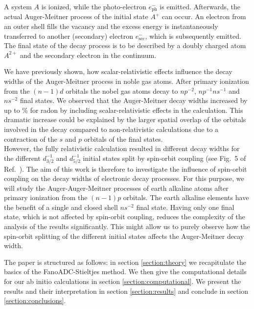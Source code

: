 A system $A$ is ionized, while the photo-electron $e^-_\text{ph}$ is emitted.      
Afterwards, the actual Auger-Meitner
process of the initial state $A^+$ can occur.    
An electron from an outer                                       
shell fills the vacancy and the excess energy is instantaneously transferred  
to another (secondary) electron $e^-_\text{sec}$, which
is subsequently emitted. The final state of the decay process   
is to be described by a doubly charged atom $A^{2+}$ and the secondary        
electron in the continuum.

We have previously shown, how
scalar-relativistic effects influence the decay widths of the Auger-Meitner
process in
noble gas atoms. \cite{Fasshauer15_1}
After primary ionization from the $(n-1)d$ orbitals the nobel
gas atoms decay to $np^{-2}$, $np^{-1}ns^{-1}$ and $ns^{-2}$ final states.
We observed that the Auger-Meitner decay widths increased by up to \unit[326]{\%}
for radon
by including scalar-relativistic effects in the calculation. This
dramatic increase could be explained by the larger spatial
overlap of the orbitals
involved in the decay compared to non-relativistic calculations due to
a contraction of the $s$ and $p$ orbitals of the final states.\\
However, the fully relativistic calculation resulted in different decay widths
for the different $d_{3/2}^{-1}$ and $d_{5/2}^{-1}$ initial states split by
spin-orbit coupling (see Fig.~5 of Ref.~\cite{Fasshauer15_1}).
The aim of this work is therefore to investigate the
influence of spin-orbit coupling on the decay widths of electronic decay processes.
For this purpose, we will study the Auger-Auger-Meitner processes of earth alkaline atoms
after primary ionization from the $(n-1)p$ orbitals. The earth alkaline elements
have the benefit of a single and closed shell $ns^{-2}$ final state.
Having only one final state, which is not affected by spin-orbit coupling,
reduces the complexity of the analysis of the results significantly.
This might allow us to purely observe how the spin-orbit splitting of
the different initial states affects the Auger-Meitner decay width.

The paper is structured as follows:
in section \ref{section:theory} we recapitulate the basics of the
FanoADC-Stieltjes method. We then give the computational details for our
ab initio calculations in section \ref{section:computational}. We present the
results and their interpretation in section \ref{section:results}
and conclude in section \ref{section:conclusions}.
